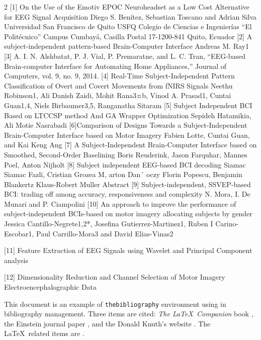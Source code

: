 \documentclass{article}
\begin{document}
\begin{multicols}{2}
[1] On the Use of the Emotiv EPOC Neuroheadset as a Low Cost Alternative for EEG Signal Acquisition
Diego S. Benítez, Sebastian Toscano and Adrian Silva Universidad San Francisco de Quito USFQ
Colegio de Ciencias e Ingenierías “El Politécnico” Campus Cumbayá, Casilla Postal 17-1200-841 Quito, Ecuador
[2] A subject-independent pattern-based Brain-Computer Interface
 Andreas M. Ray1 
[3]	A. I. N. Alshbatat, P. J. Vial, P. Premaratne, and L. C. Tran, “EEG-based Brain-computer Interface for Automating Home Appliances,” Journal of Computers, vol. 9, no. 9, 2014.
[4] Real-Time Subject-Independent Pattern Classification of Overt and Covert Movements from fNIRS Signals
Neethu Robinson1, Ali Danish Zaidi, Mohit Rana3¤b, Vinod A. Prasad1, Cuntai Guan1,4, Niels Birbaumer3,5, Ranganatha Sitaram
[5] Subject Independent BCI Based on LTCCSP method And GA Wrapper Optimization
Sepideh Hatamikia, Ali Motie Nasrabadi
[6]Comparison of Designs Towards a Subject-Independent Brain-Computer Interface based on Motor Imagery
Fabien Lotte, Cuntai Guan, and Kai Keng Ang
[7] A Subject-Independent Brain-Computer Interface based on Smoothed, Second-Order Baselining
Boris Reuderink, Jason Farquhar, Mannes Poel, Anton Nijholt
[8] Subject independent EEG-based BCI decoding Siamac
Siamac Fazli, Cristian Grozea M, arton Dan´ oczy Florin Popescu, Benjamin Blankertz Klaus-Robert Muller Abstract
[9] Subject-independent, SSVEP-based BCI: trading off among accuracy, responsiveness and complexity
N. Mora, I. De Munari and P. Ciampolini
[10] An approach to improve the performance of subject-independent BCIs-based on motor imagery
allocating subjects by gender
Jessica Cantillo-Negrete1,2*, Josefina Gutierrez-Martinez1, Ruben I Carino-Escobar1, Paul Carrillo-Mora3 and David Elias-Vinas2

[11] Feature Extraction of EEG Signals using Wavelet and Principal Component analysis

[12] Dimensionality Reduction and Channel Selection of Motor Imagery Electroencephalographic Data


This document is an example of \texttt{thebibliography} environment using 
in bibliography management. Three items are cited: \textit{The \LaTeX\ Companion} 
book \cite{latexcompanion}, the Einstein journal paper \cite{einstein}, and the 
Donald Knuth's website \cite{knuthwebsite}. The \LaTeX\ related items are
\cite{latexcompanion,knuthwebsite}. 





\end{multicols}
\end{document}
